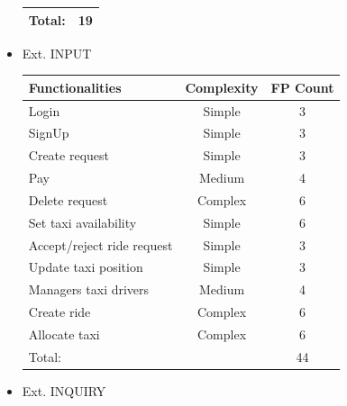 \documentclass[a4paper,11pt]{report} %
\begin{document}
\begin{itemize}
\begin{center}
\begin{tabular}{| p{7cm} | p{2.5cm} | p{2cm} |}
						\multicolumn{2}{|l|}{Total:} & \multicolumn{1}{|c|}{19}\\\hline	
					\end{tabular}
				\end{center}
				\item Ext. INPUT
				\renewcommand{\arraystretch}{1.2}
				\setlength{\tabcolsep}{12pt}
				\begin{center}
					\begin{tabular}{| p{7cm} | p{2.5cm} | p{2cm} |}\hline
						\textbf{Functionalities} & \multicolumn{1}{|c|}{\textbf{Complexity}} & \textbf{FP Count}\\\hline
						Login & \multicolumn{1}{|c|}{Simple} & \multicolumn{1}{|c|}{3}\\\hline
						SignUp & \multicolumn{1}{|c|}{Simple} & \multicolumn{1}{|c|}{3}\\\hline
						Create request & \multicolumn{1}{|c|}{Simple} & \multicolumn{1}{|c|}{3}\\\hline					
						Pay & \multicolumn{1}{|c|}{Medium} & \multicolumn{1}{|c|}{4}\\\hline		
						Delete request & \multicolumn{1}{|c|}{Complex} & \multicolumn{1}{|c|}{6}\\\hline	
						Set taxi availability & \multicolumn{1}{|c|}{Simple} & \multicolumn{1}{|c|}{6}\\\hline					
						Accept/reject ride request & \multicolumn{1}{|c|}{Simple} & \multicolumn{1}{|c|}{3}\\\hline			
						Update taxi position & \multicolumn{1}{|c|}{Simple} & \multicolumn{1}{|c|}{3}\\\hline				
						Managers taxi drivers & \multicolumn{1}{|c|}{Medium} & \multicolumn{1}{|c|}{4}\\\hline				
						Create ride & \multicolumn{1}{|c|}{Complex} & \multicolumn{1}{|c|}{6}\\\hline		
						Allocate taxi & \multicolumn{1}{|c|}{Complex} & \multicolumn{1}{|c|}{6}\\\hline																																																												
						\multicolumn{2}{|l|}{Total:} & \multicolumn{1}{|c|}{44}\\\hline
					\end{tabular}
				\end{center}
				\item Ext. INQUIRY
				\renewcommand{\arraystretch}{1.2}
				\setlength{\tabcolsep}{12pt}
				\begin{center}
					\begin{tabular}{| p{7cm} | p{2.5cm} | p{2cm} |}\hline

\end{tabular}
\end{center}
\end{itemize}
\end{document}
